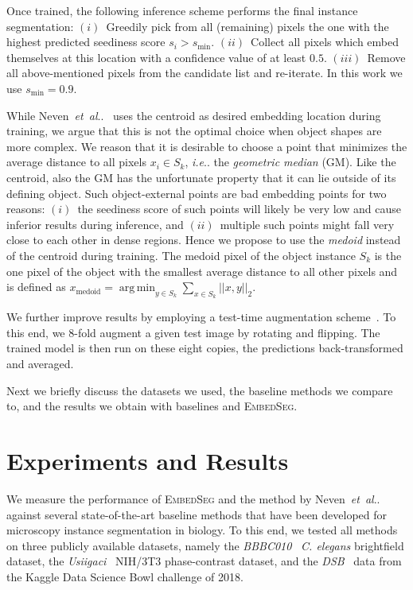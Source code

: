 \documentclass{midl}
\makeatletter
\newcommand{\EmbedSeg}{\mbox{\textsc{EmbedSeg}}\xspace}
\DeclareRobustCommand\onedot{\futurelet\@let@token\@onedot}
\def\@onedot{\ifx\@let@token.\else.\null\fi\xspace}
\def\ie{\emph{i.e}\onedot} \def\Ie{\emph{I.e}\onedot}
\def\etal{\emph{et~al}\onedot}
\DeclareMathOperator*{\argmin}{arg\,min}
\makeatother
\begin{document}
Once trained, the following inference scheme performs the final instance segmentation:
$(i)$~Greedily pick from all (remaining) pixels the one with the highest predicted seediness score $s_i > s_{\text{min}}$.
$(ii)$~Collect all pixels which embed themselves at this location with a confidence value of at least $0.5$.
$(iii)$~Remove all above-mentioned pixels from the candidate list and re-iterate.
In this work we use  $s_{\text{min}}=0.9$.

While Neven~\etal~\cite{neven2019} uses the centroid as desired embedding location during training, we argue that this is not the optimal choice when object shapes are more complex. 
We reason that it is desirable to choose a point that minimizes the average distance to all pixels $x_i \in S_k$, \ie the \textit{geometric median} (GM).
Like the centroid, also the GM has the unfortunate property that it can lie outside of its defining object. 
Such object-external points are bad embedding points for two reasons:
$(i)$~the seediness score of such points will likely be very low and cause inferior results during inference, and
$(ii)$~multiple such points might fall very close to each other in dense regions.
Hence we propose to use the \textit{medoid} instead of the centroid during training.
The medoid pixel of the object instance $S_k$ is the one pixel of the object with the smallest average distance to all other pixels and is defined as
$x_\text{medoid} = \argmin_{y \in S_k} \sum_{x \in S_k} ||x,y||_2$.

We further improve results by employing a test-time augmentation scheme~\cite{wang2019,stringer2020}. 
To this end, we 8-fold augment a given test image by rotating and flipping. 
The trained model is then run on these eight copies, the predictions back-transformed and averaged.

Next we briefly discuss the datasets we used, the baseline methods we compare to, and the results we obtain with baselines and \EmbedSeg.

\section{Experiments and Results}
\label{sec:results}
We measure the performance of \EmbedSeg and the method by Neven~\etal~\cite{neven2019} against several state-of-the-art baseline methods that have been developed for microscopy instance segmentation in biology.
To this end, we tested all methods on three publicly available datasets, namely the \emph{BBBC010}~\cite{ljosa2012} \textit{C. elegans} brightfield dataset, the \emph{Usiigaci}~\cite{tsai2019} NIH/3T3 phase-contrast dataset, and the \emph{DSB}~\cite{caicedo2019} data from the Kaggle Data Science Bowl challenge of 2018.
\end{document}
